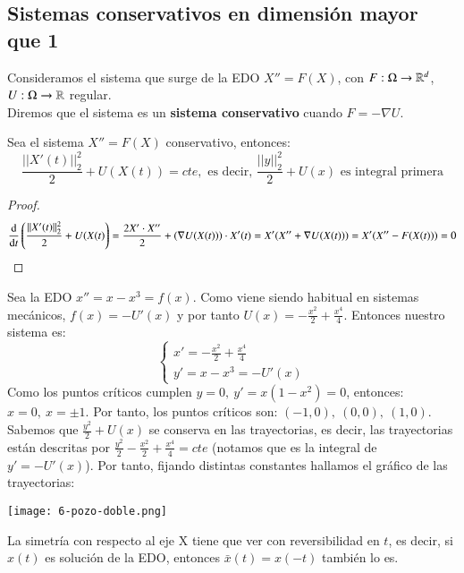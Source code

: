 \subsection{Sistemas conservativos en dimensión mayor que 1}
\begin{dfn}
    Consideramos el sistema que surge de la EDO $X'' = F(X)$, con $F: \Omega \to \mathbb{R}^d$, $U: \Omega \to \mathbb{R}$ regular.\\
    Diremos que el sistema es un \textbf{sistema conservativo} cuando $F = -\nabla U$.
\end{dfn}
\begin{pro}
    Sea el sistema $X'' = F(X)$ conservativo, entonces:
    $$
        \frac{||X'(t)||_2^2}{2} + U(X(t)) = cte, \text{ es decir, } \frac{||y||_2^2}{2} + U(x) \text{ es integral primera}
    $$
\end{pro}
\begin{proof}
    $$
    \frac{\mathrm{d}}{\mathrm{d}t} \left(\frac{||X'(t)||_2^2}{2} +  U(X(t)\right) = \frac{2 X' \cdot X''}{2} + (\nabla U(X(t))) \cdot X'(t) = X'(X'' + \nabla U(X(t))) = X'(X'' - F(X(t))) = 0
    $$
\end{proof}
\begin{eg}
    Sea la EDO $x'' = x - x^3 = f(x)$. Como viene siendo habitual en sistemas mecánicos, $f(x) = -U'(x)$ y por tanto $U(x) = -\frac{x^2}{2}+\frac{x^4}{4}$. Entonces nuestro sistema es:
    $$
    \begin{cases}
        x' = -\frac{x^2}{2}+\frac{x^4}{4}\\
        y' = x - x^3 = -U'(x)
    \end{cases}
    $$
    Como los puntos críticos cumplen $y=0,\ y'= x(1-x^2) = 0$, entonces: $x=0,\ x=\pm 1$. Por tanto, los puntos críticos son: $ (-1, 0),\ (0, 0),\ (1, 0)$.\\
    Sabemos que $\frac{y^2}{2} + U(x)$ se conserva en las trayectorias, es decir, las trayectorias están descritas por $\frac{y^2}{2}  -\frac{x^2}{2}+\frac{x^4}{4} = cte$ (notamos que es la integral de $y' = -U'(x)$). Por tanto, fijando distintas constantes hallamos el gráfico de las trayectorias:
    \begin{center}
        \texttt{[image: 6-pozo-doble.png]}
    \end{center}
\end{eg}
\begin{obs}
    La simetría con respecto al eje X tiene que ver con reversibilidad en $t$, es decir, si $x(t)$ es solución de la EDO, entonces $\bar{x}(t) = x(-t)$ también lo es.
\end{obs}

